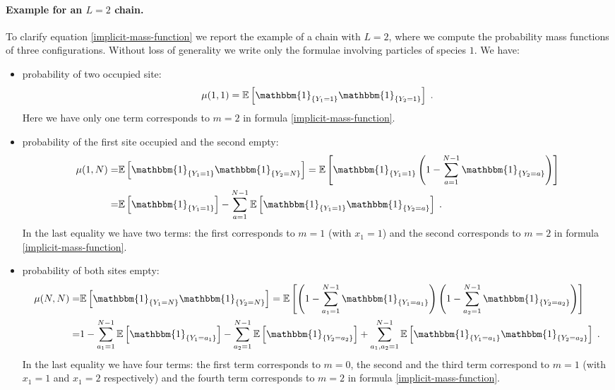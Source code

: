\documentclass[10pt]{article}
\numberwithin{equation}{section}
\numberwithin{equation}{subsection}
\newcommand{\dt}{\;.}
\begin{document}
\paragraph{Example for an $L=2$ chain.} To clarify equation \eqref{implicit-mass-function} we report the example of a chain with $L=2$, where we compute the probability mass functions of three configurations. Without loss of generality we write only the formulae involving particles of species $1$. We have: 
 \begin{itemize}
 	\item probability of two occupied site:
 	\begin{equation}
 		\mu(1,1)=\mathbb{E}\left[\mathbbm{1}_{\{Y_{1}=1\}}\mathbbm{1}_{\{Y_{2}=1\}}\right]\dt
 	\end{equation}
 	Here we have only one term corresponds to $m=2$ in formula  \eqref{implicit-mass-function}.

 	\item probability of the first site occupied and the second empty:
 	\begin{align}
 		\mu(1,N)=&\mathbb{E}\left[\mathbbm{1}_{\{Y_{1}=1\}}\mathbbm{1}_{\{Y_{2}=N\}}\right]=\mathbb{E}\left[\mathbbm{1}_{\{Y_{1}=1\}}\left(1-\sum_{a=1}^{N-1}\mathbbm{1}_{\{Y_{2}=a\}}\right)\right]\nonumber
 		\\=&
 		\mathbb{E}\left[\mathbbm{1}_{\{Y_{1}=1\}}\right]-\sum_{a=1}^{N-1}\mathbb{E}\left[\mathbbm{1}_{\{Y_{1}=1\}}\mathbbm{1}_{\{Y_{2}=a\}}\right]\dt
 	\end{align}
	{In the last equality we have two terms: the first corresponds to $m=1$ (with $x_{1}=1$) and the second corresponds to $m=2$ in formula \eqref{implicit-mass-function}.}
 	\item probability of both sites empty:
 	\begin{align}
 		\mu(N,N)=&\mathbb{E}\left[\mathbbm{1}_{\{Y_{1}=N\}}\mathbbm{1}_{\{Y_{2}=N\}}\right]=\mathbb{E}\left[\left(1-\sum_{a_{1}=1}^{N-1}\mathbbm{1}_{\{Y_{1}=a_{1}\}}\right)\left(1-\sum_{a_{2}=1}^{N-1}\mathbbm{1}_{\{Y_{2}=a_{2}\}}\right)\right]\nonumber
 		\\=&
 		1-\sum_{a_{1}=1}^{N-1}\mathbb{E}\left[\mathbbm{1}_{\{Y_{1}=a_{1}\}}\right]-\sum_{a_{2}=1}^{N-1}\mathbb{E}\left[\mathbbm{1}_{\{Y_{2}=a_{2}\}}\right]+\sum_{a_{1},a_{2}=1}^{N-1}\mathbb{E}\left[\mathbbm{1}_{\{Y_{1}=a_{1}\}}\mathbbm{1}_{\{Y_{2}=a_{2}\}}\right]\dt
 	\end{align}
 	{In the last equality we have four terms: the first term corresponds to $m=0$, the second and the third term correspond to $m=1$ (with $x_{1}=1$ and $x_{1}=2$ respectively) and the fourth term corresponds to $m=2$ in formula \eqref{implicit-mass-function}. } 
 \end{itemize}
\end{document}
